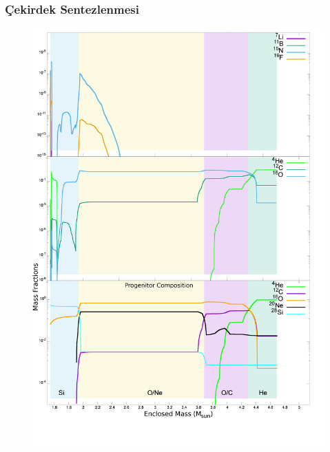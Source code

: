 \documentclass[10pt]{beamer}
\begin{document}
\begin{frame}
    \frametitle{Çekirdek Sentezlenmesi}
    \begin{minipage}{0.45\textwidth}
        \begin{figure}[hbt!]
            \centering
            \includegraphics[width=\textwidth]{fig/abundadecay_noNu_he4li7b11c12n15o16f19_hor.png}
        \end{figure}
    \end{minipage}
    \hfill
    \begin{minipage}{0.45\textwidth}
        \begin{figure}[hbt!]
            \centering

\end{figure}
\end{minipage}
\end{frame}
\end{document}

